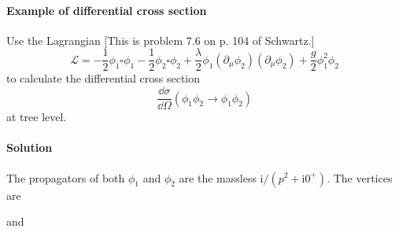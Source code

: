 \documentclass[hyperref, a4paper]{article}
\newcommand*{\ii}{\mathrm{i}}
\begin{document}
\paragraph{}

\paragraph{Example of differential cross section} Use the Lagrangian [This is problem $7.6$ on p. 104 of Schwartz.]
\[
\mathcal{L}=-\frac{1}{2} \phi_{1} \square \phi_{1}-\frac{1}{2} \phi_{2} \square \phi_{2}+\frac{\lambda}{2} \phi_{1}\left(\partial_{\mu} \phi_{2}\right)\left(\partial_{\mu} \phi_{2}\right)+\frac{g}{2} \phi_{1}^{2} \phi_{2}
\]
to calculate the differential cross section
\[
\frac{\dd \sigma}{\dd \Omega}\left(\phi_{1} \phi_{2} \rightarrow \phi_{1} \phi_{2}\right)
\]
at tree level.

\paragraph{Solution} The propagators of both $\phi_1$ and $\phi_2$ are the massless $\ii / (p^2 + \ii 0^+)$.
The vertices are 

and

\end{document}
